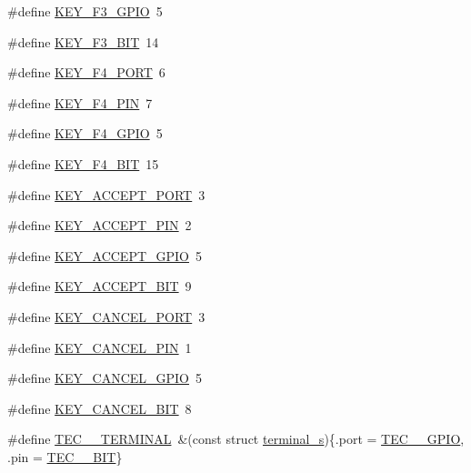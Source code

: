\begin{DoxyCompactItemize}
\#define \hyperlink{group__hal_gac7de7a3e791e70cb61e1ba74c23fd8f3}{K\+E\+Y\+\_\+\+F3\+\_\+\+G\+P\+IO}~5
\item 
\#define \hyperlink{group__hal_ga0b750ff71397168903bb9406b4a0bc43}{K\+E\+Y\+\_\+\+F3\+\_\+\+B\+IT}~14
\item 
\#define \hyperlink{group__hal_gaeb2af3258e8481b8855ee6df928fdae4}{K\+E\+Y\+\_\+\+F4\+\_\+\+P\+O\+RT}~6
\item 
\#define \hyperlink{group__hal_ga0b7c8de71cb61c639769e5b3b8ba9603}{K\+E\+Y\+\_\+\+F4\+\_\+\+P\+IN}~7
\item 
\#define \hyperlink{group__hal_gabc1b6065dd7a4f9e7c7eb492f7d3d548}{K\+E\+Y\+\_\+\+F4\+\_\+\+G\+P\+IO}~5
\item 
\#define \hyperlink{group__hal_gadd1233da3fb79555176e60c1433f5d2c}{K\+E\+Y\+\_\+\+F4\+\_\+\+B\+IT}~15
\item 
\#define \hyperlink{group__hal_gac8f017f65635f88ecc35b36bfe9350cb}{K\+E\+Y\+\_\+\+A\+C\+C\+E\+P\+T\+\_\+\+P\+O\+RT}~3
\item 
\#define \hyperlink{group__hal_gaacdece44fd577054dbd03456a76005db}{K\+E\+Y\+\_\+\+A\+C\+C\+E\+P\+T\+\_\+\+P\+IN}~2
\item 
\#define \hyperlink{group__hal_gaec67cfa1c357906d3146de59945a5af1}{K\+E\+Y\+\_\+\+A\+C\+C\+E\+P\+T\+\_\+\+G\+P\+IO}~5
\item 
\#define \hyperlink{group__hal_ga099967afffab053d7b61dc41f1806b8d}{K\+E\+Y\+\_\+\+A\+C\+C\+E\+P\+T\+\_\+\+B\+IT}~9
\item 
\#define \hyperlink{group__hal_ga1bd0a92ccf5d51cbf7510082eff13a95}{K\+E\+Y\+\_\+\+C\+A\+N\+C\+E\+L\+\_\+\+P\+O\+RT}~3
\item 
\#define \hyperlink{group__hal_ga42a5a9380916b6a8f9a1601e4d16e3ce}{K\+E\+Y\+\_\+\+C\+A\+N\+C\+E\+L\+\_\+\+P\+IN}~1
\item 
\#define \hyperlink{group__hal_ga072fd7b6b6eb89b2e4a61425d8b81b09}{K\+E\+Y\+\_\+\+C\+A\+N\+C\+E\+L\+\_\+\+G\+P\+IO}~5
\item 
\#define \hyperlink{group__hal_ga26ec6a583f60654278e37c9d911d791b}{K\+E\+Y\+\_\+\+C\+A\+N\+C\+E\+L\+\_\+\+B\+IT}~8
\item 
\#define \hyperlink{group__hal_gaff1d0922fe20ad714250846eee12de81}{T\+E\+C\+\_\+\_\+\+T\+E\+R\+M\+I\+N\+AL}~\&(const struct \hyperlink{structterminal__s}{terminal\+\_\+s})\{.port = \hyperlink{group__samples_ga8731b2048404c4c819291bebfc6a1e6a}{T\+E\+C\+\_\+\_\+\+G\+P\+IO}, .pin = \hyperlink{group__samples_ga0f27cf5eeffd9d5f04a6a4c57bbdbae7}{T\+E\+C\+\_\+\_\+\+B\+IT}\}
\item 

\end{DoxyCompactItemize}
